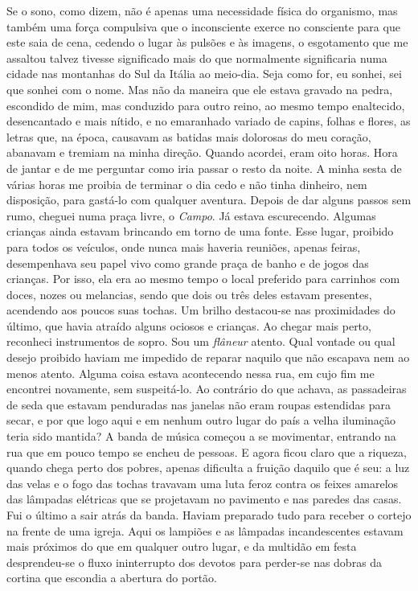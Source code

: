 Se o sono, como dizem, não é apenas uma necessidade física do organismo,
mas também uma força compulsiva que o inconsciente exerce no consciente
para que este saia de cena, cedendo o lugar às pulsões e às imagens, o
esgotamento que me assaltou talvez tivesse significado mais do que
normalmente significaria numa cidade nas montanhas do Sul da Itália ao
meio-dia. Seja como for, eu sonhei, sei que sonhei com o nome. Mas não
da maneira que ele estava gravado na pedra, escondido de mim, mas
conduzido para outro reino, ao mesmo tempo enaltecido, desencantado e
mais nítido, e no emaranhado variado de capins, folhas e flores, as
letras que, na época, causavam as batidas mais dolorosas do meu coração,
abanavam e tremiam na minha direção. Quando acordei, eram oito horas.
Hora de jantar e de me perguntar como iria passar o resto da noite. A
minha sesta de várias horas me proibia de terminar o dia cedo e não
tinha dinheiro, nem disposição, para gastá-lo com qualquer aventura.
Depois de dar alguns passos sem rumo, cheguei numa praça livre, o
\emph{Campo}. Já estava escurecendo. Algumas crianças ainda estavam
brincando em torno de uma fonte. Esse lugar, proibido para todos os
veículos, onde nunca mais haveria reuniões, apenas feiras, desempenhava
seu papel vivo como grande praça de banho e de jogos das crianças. Por
isso, ela era ao mesmo tempo o local preferido para carrinhos com doces,
nozes ou melancias, sendo que dois ou três deles estavam presentes,
acendendo aos poucos suas tochas. Um brilho destacou-se nas proximidades
do último, que havia atraído alguns ociosos e crianças. Ao chegar mais
perto, reconheci instrumentos de sopro. Sou um \emph{flâneur} atento.
Qual vontade ou qual desejo proibido haviam me impedido de reparar
naquilo que não escapava nem ao menos atento. Alguma coisa estava
acontecendo nessa rua, em cujo fim me encontrei novamente, sem
suspeitá-lo. Ao contrário do que achava, as passadeiras de seda que
estavam penduradas nas janelas não eram roupas estendidas para secar, e
por que logo aqui e em nenhum outro lugar do país a velha iluminação
teria sido mantida? A banda de música começou a se movimentar, entrando
na rua que em pouco tempo se encheu de pessoas. E agora ficou claro que
a riqueza, quando chega perto dos pobres, apenas dificulta a fruição
daquilo que é seu: a luz das velas e o fogo das tochas travavam uma luta
feroz contra os feixes amarelos das lâmpadas elétricas que se projetavam
no pavimento e nas paredes das casas. Fui o último a sair atrás da
banda. Haviam preparado tudo para receber o cortejo na frente de uma
igreja. Aqui os lampiões e as lâmpadas incandescentes estavam mais
próximos do que em qualquer outro lugar, e da multidão em festa
desprendeu-se o fluxo ininterrupto dos devotos para perder-se nas dobras
da cortina que escondia a abertura do portão.

